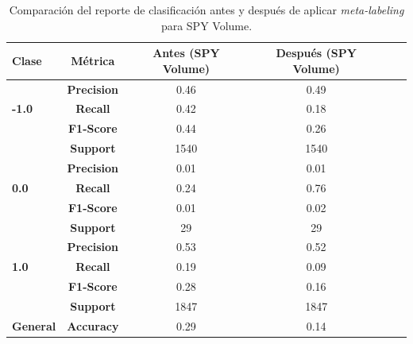 \documentclass[a4paper,12pt, twoside]{report}
\begin{document}
\begin{table}[h!]
    \centering
    \begin{tabular}{lccccc}
    \hline
    \textbf{Clase} & \textbf{Métrica} & \textbf{Antes (SPY Volume)} & \textbf{Después (SPY Volume)} \\
    \hline
    \multirow{3}{*}{\textbf{-1.0}} & \textbf{Precision} & 0.46 & 0.49 \\
                                   & \textbf{Recall}    & 0.42 & 0.18 \\
                                   & \textbf{F1-Score}  & 0.44 & 0.26 \\
                                   & \textbf{Support}   & 1540 & 1540 \\
    \hline
    \multirow{3}{*}{\textbf{0.0}} & \textbf{Precision}  & 0.01 & 0.01 \\
                                  & \textbf{Recall}     & 0.24 & 0.76 \\
                                  & \textbf{F1-Score}   & 0.01 & 0.02 \\
                                  & \textbf{Support}    & 29 & 29 \\
    \hline
    \multirow{3}{*}{\textbf{1.0}} & \textbf{Precision}  & 0.53 & 0.52 \\
                                  & \textbf{Recall}     & 0.19 & 0.09 \\
                                  & \textbf{F1-Score}   & 0.28 & 0.16 \\
                                  & \textbf{Support}    & 1847 & 1847 \\
    \hline
    \textbf{General} & \textbf{Accuracy} & 0.29 & 0.14 \\
    \hline
    \end{tabular}
    \caption{Comparación del reporte de clasificación antes y después de aplicar \textit{meta-labeling} para SPY Volume.}
    \label{tab:classification_report_spy_volume}
\end{table}
    
\end{document}
